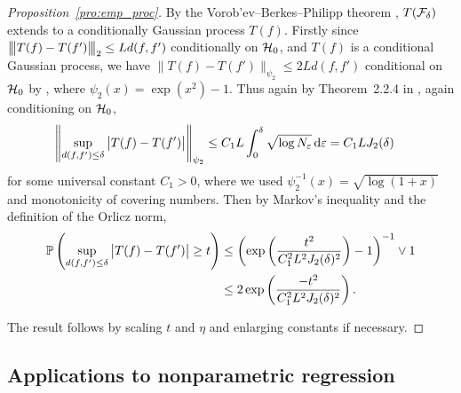 \begin{proof}[Proposition~\ref{pro:emp_proc}]

  By the Vorob'ev--Berkes--Philipp theorem
  \citep{dudley1999uniform},
  $T(\cF_\delta)$ extends to a conditionally Gaussian process $T(f)$.
  Firstly since
  $\bigvvvert T(f) - T(f') \bigvvvert_2 \leq L d(f,f')$
  conditionally on $\cH_0$,
  and $T(f)$ is a conditional Gaussian process, we have
  $\big\| T(f) - T(f') \big\|_{\psi_2} \leq 2 L d(f,f')$
  conditional on $\cH_0$
  by \citet[Chapter~2.2, Complement~1]{van1996weak},
  where $\psi_2(x) = \exp(x^2) - 1$.
  Thus again by Theorem~2.2.4 in \citet{van1996weak},
  again conditioning on $\cH_0$,
  \begin{align*}
    \left\|
    \sup_{d(f,f') \leq \delta}
    \big| T(f) - T(f') \big|
    \right\|_{\psi_2}
    &\leq
    C_1 L
    \int_0^\delta
    \sqrt{\log N_\varepsilon} \diff{\varepsilon}
    = C_1 L J_2(\delta)
  \end{align*}
  for some universal constant $C_1 > 0$,
  where we used $\psi_2^{-1}(x) = \sqrt{\log(1+x)}$
  and monotonicity of covering numbers.
  Then by Markov's inequality and the definition of the Orlicz norm,
  \begin{align*}
    \P\left(
      \sup_{d(f,f') \leq \delta}
      \big| T(f) - T(f') \big|
      \geq t
    \right)
    &\leq
    \left(
      \exp\left(
        \frac{t^2}{C_1^2 L^2 J_2(\delta)^2}
      \right) - 1
    \right)^{-1}
    \vee 1 \\
    &\leq
    2 \exp\left(
      \frac{-t^2}{C_1^2 L^2 J_2(\delta)^2}
    \right).
  \end{align*}


  The result follows by scaling $t$ and $\eta$
  and enlarging constants if necessary.
\end{proof}

\subsection{Applications to nonparametric regression}

